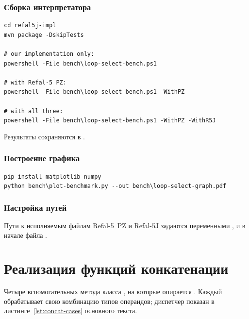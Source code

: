 \subsubsection*{Сборка интерпретатора}

\begin{longlisting}
\caption{Сборка и запуск бенчмарка}\label{lst:repro-build}
\begin{verbatim}
cd refal5j-impl
mvn package -DskipTests

# our implementation only:
powershell -File bench\loop-select-bench.ps1

# with Refal-5 PZ:
powershell -File bench\loop-select-bench.ps1 -WithPZ

# with all three:
powershell -File bench\loop-select-bench.ps1 -WithPZ -WithR5J
\end{verbatim}
\end{longlisting}

Результаты сохраняются в .

\subsubsection*{Построение графика}

\begin{longlisting}
\caption{Построение графика}\label{lst:repro-plot}
\begin{verbatim}
pip install matplotlib numpy
python bench\plot-benchmark.py --out bench\loop-select-graph.pdf
\end{verbatim}
\end{longlisting}

\subsubsection*{Настройка путей}

Пути к исполняемым файлам Refal-5~PZ и Refal-5J задаются переменными
,  и  в начале файла
.

\section{Реализация функций конкатенации}
\label{app:concat-impl}

Четыре вспомогательных метода класса , на которые
опирается . Каждый обрабатывает свою комбинацию
типов операндов; диспетчер показан в листинге~\ref{lst:concat-cases}
основного текста.

